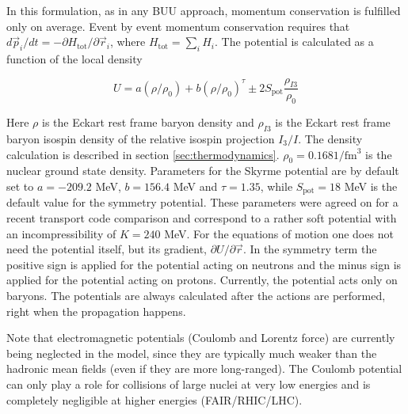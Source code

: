 In this formulation, as in any BUU approach, momentum conservation is fulfilled
only on average. Event by event momentum conservation requires that $d\vec
p_i/dt =-\partial H_\text{tot}/\partial \vec r_i$, where $H_\text{tot} = \sum_i
H_i$. The potential is calculated as a function of the local density

\begin{equation} \label{eq:potential}
  U = a (\rho/\rho_0) + b (\rho/\rho_0)^{\tau} \pm 2 S_\text{pot} \frac{\rho_{I3}}{\rho_0}
\end{equation}

Here $\rho$ is the Eckart rest frame baryon density and $\rho_{I3}$ is the
Eckart rest frame baryon isospin density of the relative isospin projection
$I_3/I$. The density calculation is described in section
\ref{sec:thermodynamics}. $\rho_0=0.168 1/\text{fm}^3$ is the nuclear
ground state density.  Parameters for the Skyrme potential are by default set
to $a=-209.2$ MeV, $b=156.4$ MeV and $\tau = 1.35$, while $S_\text{pot} = 18$
MeV is the default value for the symmetry potential. These parameters were
agreed on for a recent transport code comparison \cite{Xu:2016lue} and
correspond to a rather soft potential with an incompressibility of $K=240$ MeV.
For the equations of motion one does not need the potential itself, but its
gradient, $\partial U/\partial \vec r$. In the symmetry term the positive sign
is applied for the potential acting on neutrons and the minus sign is applied
for the potential acting on protons. Currently, the potential acts only on
baryons. The potentials are always calculated after the actions are performed,
right when the propagation happens.

Note that electromagnetic potentials (Coulomb and Lorentz force) are
currently being neglected in the model, since they are typically much weaker
than the hadronic mean fields (even if they are more long-ranged). The Coulomb
potential can only play a role for collisions of large nuclei at very low
energies and is completely negligible at higher energies (FAIR/RHIC/LHC).

